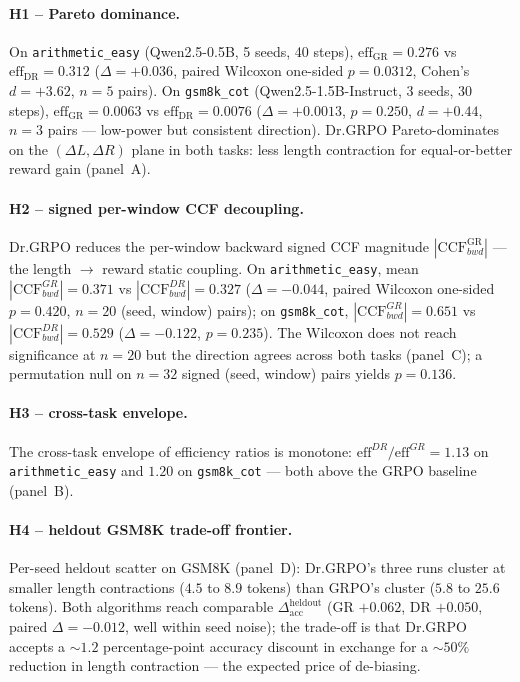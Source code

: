 \documentclass{article}
\begin{document}
\paragraph{H1 -- Pareto dominance.}
On \texttt{arithmetic\_easy} (Qwen2.5-0.5B, 5 seeds, 40 steps),
$\mathrm{eff}_{\mathrm{GR}} = 0.276$ vs $\mathrm{eff}_{\mathrm{DR}} = 0.312$
($\Delta = +0.036$, paired Wilcoxon one-sided $p = 0.0312$,
Cohen's $d = +3.62$, $n{=}5$ pairs).
On \texttt{gsm8k\_cot} (Qwen2.5-1.5B-Instruct, 3 seeds, 30 steps),
$\mathrm{eff}_{\mathrm{GR}} = 0.0063$ vs $\mathrm{eff}_{\mathrm{DR}} = 0.0076$
($\Delta = +0.0013$, $p = 0.250$, $d = +0.44$, $n{=}3$ pairs ---
low-power but consistent direction).
Dr.GRPO Pareto-dominates on the $(\Delta L, \Delta R)$ plane in both
tasks: less length contraction for equal-or-better reward gain (panel~A).

\paragraph{H2 -- signed per-window CCF decoupling.}
Dr.GRPO reduces the per-window backward signed CCF magnitude
$|\mathrm{CCF}^{\mathrm{GR}}_{bwd}|$ --- the length $\to$ reward
static coupling.  On \texttt{arithmetic\_easy}, mean
$|\mathrm{CCF}^{GR}_{bwd}|=0.371$ vs $|\mathrm{CCF}^{DR}_{bwd}|=0.327$
($\Delta = -0.044$, paired Wilcoxon one-sided $p = 0.420$,
$n{=}20$ (seed, window) pairs); on \texttt{gsm8k\_cot},
$|\mathrm{CCF}^{GR}_{bwd}|=0.651$ vs $|\mathrm{CCF}^{DR}_{bwd}|=0.529$
($\Delta = -0.122$, $p = 0.235$).  The Wilcoxon does not reach
significance at $n{=}20$ but the direction agrees across both tasks
(panel~C); a permutation null on $n{=}32$ signed (seed, window) pairs yields
$p = 0.136$.

\paragraph{H3 -- cross-task envelope.}
The cross-task envelope of efficiency ratios is monotone: $\mathrm{eff}^{DR}/\mathrm{eff}^{GR} = 1.13$
on \texttt{arithmetic\_easy} and $1.20$ on \texttt{gsm8k\_cot} ---
both above the GRPO baseline (panel~B).

\paragraph{H4 -- heldout GSM8K trade-off frontier.}
Per-seed heldout scatter on GSM8K (panel~D): Dr.GRPO's three runs
cluster at smaller length contractions ($4.5$ to $8.9$ tokens) than GRPO's
cluster ($5.8$ to $25.6$ tokens).  Both algorithms reach comparable
$\Delta_{\mathrm{acc}}^{\mathrm{heldout}}$ (GR $+0.062$, DR $+0.050$,
paired $\Delta = -0.012$, well within seed noise); the trade-off is
that Dr.GRPO accepts a $\sim 1.2$ percentage-point accuracy
discount in exchange for a $\sim 50\%$ reduction in length
contraction --- the expected price of de-biasing.
\end{document}
